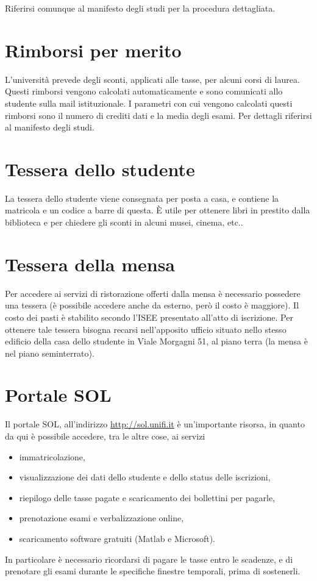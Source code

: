 \documentclass[11pt,a4paper]{article}
\begin{document}
Riferirsi comunque al manifesto degli studi per la procedura
dettagliata.

\section{Rimborsi per merito}
L'università prevede degli sconti, applicati alle tasse, per alcuni
corsi di laurea. Questi rimborsi vengono calcolati automaticamente e
sono comunicati allo studente sulla mail istituzionale. I parametri
con cui vengono calcolati questi rimborsi sono il numero di crediti
dati e la media degli esami. Per dettagli riferirsi al manifesto degli
studi.

\section{Tessera dello studente}
La tessera dello studente viene consegnata per posta a casa, e
contiene la matricola e un codice a barre di questa. È utile per
ottenere libri in prestito dalla biblioteca e per chiedere gli sconti
in alcuni musei, cinema, etc..

\section{Tessera della mensa}
Per accedere ai servizi di
ristorazione offerti dalla mensa è necessario possedere una tessera (è
possibile accedere anche da esterno, però il costo è maggiore). Il
costo dei pasti è stabilito secondo l'\ac{ISEE} presentato all'atto
di iscrizione. Per
ottenere tale tessera bisogna recarsi nell'apposito ufficio situato
nello stesso edificio della casa dello studente in Viale Morgagni 51,
al piano terra (la mensa è nel piano seminterrato).

\section{Portale \acf{SOL}}
Il portale \ac{SOL}, all'indirizzo \url{http://sol.unifi.it} è
un'importante risorsa, in quanto da qui è possibile accedere, tra le
altre cose, ai servizi
\begin{itemize}
\item immatricolazione,
\item visualizzazione dei dati dello studente e dello status delle iscrizioni,
\item riepilogo delle tasse pagate e scaricamento dei
  bollettini per pagarle,
\item prenotazione esami e verbalizzazione online,
\item scaricamento software gratuiti (Matlab e Microsoft).
\end{itemize}
In particolare è necessario ricordarsi di pagare le tasse entro le
scadenze, e di prenotare gli esami durante le specifiche finestre
temporali, prima di sostenerli.
\end{document}

